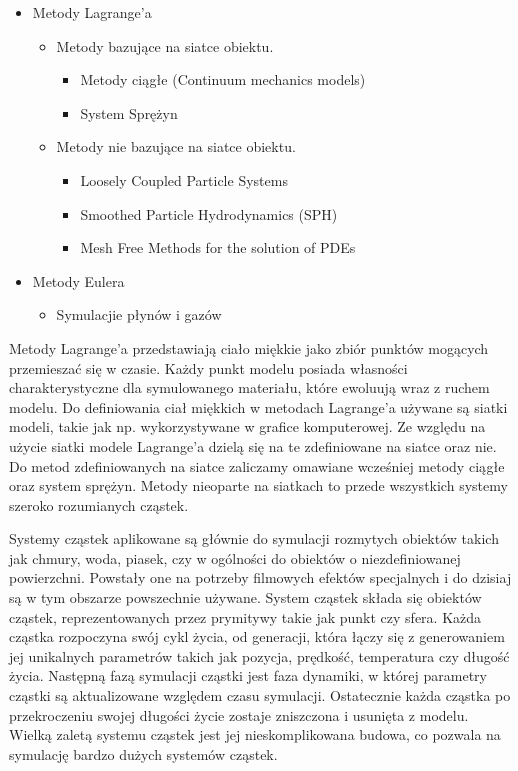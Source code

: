 \begin{itemize}
\item Metody Lagrange'a
	\begin{itemize}
	\item Metody bazujące na siatce obiektu.
		\begin{itemize}
			\item Metody ciągłe (Continuum mechanics models)
			\item System Sprężyn
		\end{itemize}
	\item Metody nie bazujące na siatce obiektu.
		\begin{itemize}
			\item Loosely Coupled Particle Systems 
			\item Smoothed Particle Hydrodynamics (SPH) 
			\item Mesh Free Methods for the solution of PDEs 
		\end{itemize}
	\end{itemize}
\item Metody Eulera
	\begin{itemize}
		\item Symulacjie płynów i gazów
	\end{itemize}
\end{itemize}

Metody Lagrange'a przedstawiają ciało miękkie jako zbiór punktów mogących
przemieszać się w czasie. Każdy punkt modelu posiada własności
charakterystyczne dla symulowanego materiału, które ewoluują wraz z ruchem
modelu\cite{pbdo}. Do definiowania ciał miękkich w metodach Lagrange'a
używane są siatki modeli, takie jak np. wykorzystywane w grafice komputerowej. 
Ze względu na użycie siatki modele Lagrange'a dzielą się na te zdefiniowane na
siatce oraz nie. Do metod zdefiniowanych na siatce zaliczamy omawiane wcześniej 
metody ciągłe oraz system sprężyn. Metody nieoparte na siatkach to przede
wszystkich systemy szeroko rozumianych cząstek.

Systemy cząstek aplikowane są głównie do symulacji rozmytych obiektów takich jak
chmury, woda, piasek, czy w ogólności do obiektów o niezdefiniowanej
powierzchni. Powstały one na potrzeby filmowych efektów specjalnych i do dzisiaj
są w tym obszarze powszechnie używane. System cząstek składa się obiektów cząstek,
reprezentowanych przez prymitywy takie jak punkt czy sfera. Każda cząstka
rozpoczyna swój cykl życia, od generacji, która łączy się z generowaniem 
jej unikalnych parametrów takich jak pozycja, prędkość, temperatura czy długość życia.
Następną fazą symulacji cząstki jest faza dynamiki, w której parametry cząstki
są aktualizowane względem czasu symulacji. Ostatecznie każda cząstka po
przekroczeniu swojej długości życie zostaje zniszczona i usunięta z modelu.
Wielką zaletą systemu cząstek jest jej nieskomplikowana budowa, co pozwala na
symulację bardzo dużych systemów cząstek. 

